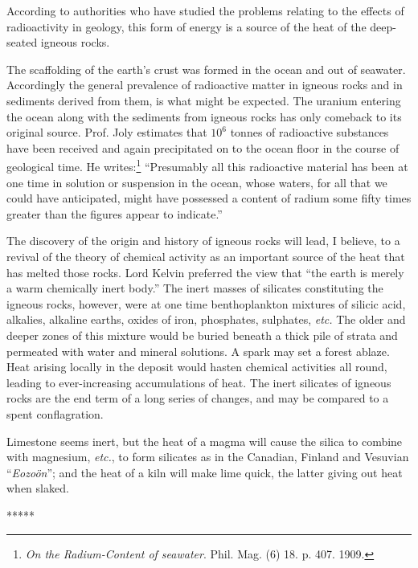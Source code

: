 \documentclass[a4paper, 12pt, oneside, landscape]{article}
\begin{document}
According to authorities who have studied the problems relating to the effects of radioactivity in geology, this form of energy is a source of the heat of the deep-seated igneous rocks.

The scaffolding of the earth's crust was formed in the ocean and out of seawater. Accordingly the general prevalence of radioactive matter in igneous rocks and in sediments derived from them, is what might be expected. The uranium entering the ocean along with the sediments from igneous rocks has only comeback to its original source. Prof. Joly estimates that $10^{6}$ tonnes of radioactive substances have been received and again precipitated on to the ocean floor in the course of geological time. He writes:\footnote{\emph{On the Radium-Content of seawater}. Phil. Mag. (6) 18. p. 407. 1909.} ``Presumably all this radioactive material has been at one time in solution or suspension in the ocean, whose waters, for all that we could have anticipated, might have possessed a content of radium some fifty times greater than the figures appear to indicate.''

The discovery of the origin and history of igneous rocks will lead, I believe, to a revival of the theory of chemical activity as an important source of the heat that has melted those rocks. Lord Kelvin preferred the view that ``the earth is merely a warm chemically inert body.'' The inert masses of silicates constituting the igneous rocks, however, were at one time benthoplankton mixtures of silicic acid, alkalies, alkaline earths, oxides of iron, phosphates, sulphates, \emph{etc.} The older and deeper zones of this mixture would be buried beneath a thick pile of strata and permeated with water and mineral solutions. A spark may set a forest ablaze. Heat arising locally in the deposit would hasten chemical activities all round, leading to ever-increasing accumulations of heat. The inert silicates of igneous rocks are the end term of a long series of changes, and may be compared to a spent conflagration.

Limestone seems inert, but the heat of a magma will cause the silica to combine with magnesium, \emph{etc.}, to form silicates as in the Canadian, Finland and Vesuvian ``\emph{Eozoön}''; and the heat of a kiln will make lime quick, the latter giving out heat when slaked.

\centerline{*\hspace{15mm}*\hspace{15mm}*\hspace{15mm}*\hspace{15mm}*}
\bigskip
\end{document}

